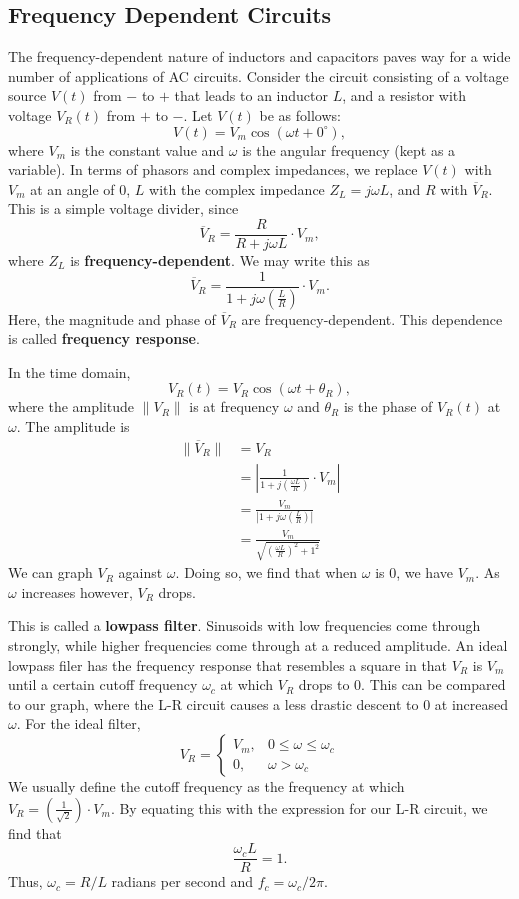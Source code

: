 \documentclass[11pt]{article}
\theoremstyle{plain} %
\theoremstyle{definition}
\theoremstyle{example}
\theoremstyle{remark}
\newcommand{\degree}{^{\circ}}
\begin{document}
\subsection{Frequency Dependent Circuits}
The frequency-dependent nature of inductors and capacitors paves way for a wide number of applications of AC circuits. Consider the circuit consisting of a voltage source $V(t)$ from $-$ to $+$ that leads to an inductor $L$, and a resistor with voltage $V_R(t)$ from $+$ to $-$. Let $V(t)$ be as follows:
$$V(t) = V_m\cos\left(\omega t + 0\degree\right),$$
where $V_m$ is the constant value and $\omega$ is the angular frequency (kept as a variable). In terms of phasors and complex impedances, we replace $V(t)$ with $V_m$ at an angle of $0$, $L$ with the complex impedance $Z_L = j\omega L$, and $R$ with $\overline V_R$. This is a simple voltage divider, since 
$$\overline V_R = \frac{R}{R+j\omega L}\cdot V_m,$$
where $Z_L$ is \textbf{frequency-dependent}. We may write this as 
$$\overline V_R = \frac{1}{1+j\omega \left(\frac{L}{R}\right)}\cdot V_m.$$
Here, the magnitude and phase of $\overline V_R$ are frequency-dependent. This dependence is called \textbf{frequency response}. 

In the time domain, 
$$V_R(t) = V_R \cos\left(\omega t + \theta_R\right),$$
where the amplitude $\|V_R\|$ is at frequency $\omega$ and $\theta_R$ is the phase of $V_R(t)$ at $\omega$. The amplitude is 
\begin{align*}
	\|\overline V_R\| &= V_R \\
	&= \left|\frac{1}{1+j\left(\frac{\omega L}{R}\right)}\cdot V_m\right|\\
	&= \frac{V_m}{\left|1+j\omega \left(\frac{L}{R}\right)\right|}\\
	&= \frac{V_m}{\sqrt{\left(\frac{\omega L}{R}\right)^2+1^2}}
\end{align*}
We can graph $V_R$ against $\omega$. Doing so, we find that when $\omega$ is 0, we have $V_m$. As $\omega$ increases however, $V_R$ drops. 

This is called a \textbf{lowpass filter}. Sinusoids with low frequencies come through strongly, while higher frequencies come through at a reduced amplitude. An ideal lowpass filer has the frequency response that resembles a square in that $V_R$ is $V_m$ until a certain cutoff frequency $\omega_c$ at which $V_R$ drops to 0. This can be compared to our graph, where the L-R circuit causes a less drastic descent to 0 at increased $\omega$. For the ideal filter, 
$$V_R = \begin{cases}
V_m, &0 \leq \omega \leq \omega_c\\
0, &\omega > \omega_c
\end{cases}
$$
We usually define the cutoff frequency as the frequency at which $V_R = \left(\frac{1}{\sqrt{2}}\right) \cdot V_m$. 
By equating this with the expression for our L-R circuit, we find that 
$$\frac{\omega_cL}{R} = 1.$$
Thus, $\omega_c = R/L$ radians per second and $f_c = \omega_c/2\pi$. 
\end{document}

